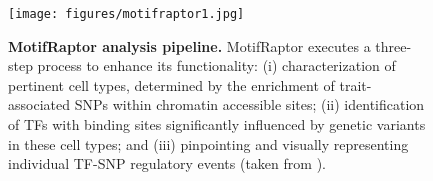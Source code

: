 \documentclass[a4paper, titlepage, openright]{book}
\newcommand{\motifraptor}{MotifRaptor\xspace}
\begin{document}
\begin{figure}
    \centering
    \texttt{[image: figures/motifraptor1.jpg]}
    \caption[MotifRaptor analysis pipeline]{\textbf{MotifRaptor analysis pipeline.} \motifraptor executes a three-step process to enhance its functionality: (i) characterization of pertinent cell types, determined by the enrichment of trait-associated SNPs within chromatin accessible sites; (ii) identification of TFs with binding sites significantly influenced by genetic variants in these cell types; and (iii) pinpointing and visually representing individual TF-SNP regulatory events (taken from \cite{yao2021motif}).}
    \label{fig:motifraptor-pipeline}
\end{figure} 

\end{document}
